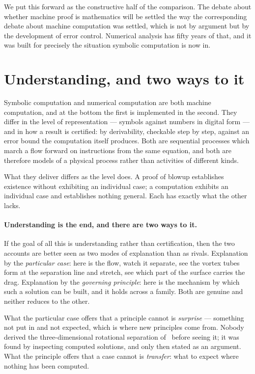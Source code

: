 \documentclass[11pt]{article}
\begin{document}
We put this forward as the constructive half of the comparison. The debate about whether machine
proof is mathematics will be settled the way the corresponding debate about machine computation was
settled, which is not by argument but by the development of error control. Numerical analysis has
fifty years of that, and it was built for precisely the situation symbolic computation is now in.

\section{Understanding, and two ways to it}\label{sec:summary}

Symbolic computation and numerical computation are both machine computation, and at the bottom the
first is implemented in the second. They differ in the level of representation --- symbols against
numbers in digital form --- and in how a result is certified: by derivability, checkable step by
step, against an error bound the computation itself produces. Both are sequential processes which
march a flow forward on instructions from the same equation, and both are therefore models of a
physical process rather than activities of different kinds.

What they deliver differs as the level does. A proof of blowup establishes existence without
exhibiting an individual case; a computation exhibits an individual case and establishes nothing
general. Each has exactly what the other lacks.

\paragraph{Understanding is the end, and there are two ways to it.} If the goal of all this is
understanding rather than certification, then the two accounts are better seen as two modes of
explanation than as rivals. Explanation by the \emph{particular case}: here is the flow, watch it
separate, see the vortex tubes form at the separation line and stretch, see which part of the surface
carries the drag. Explanation by the \emph{governing principle}: here is the mechanism by which such
a solution can be built, and it holds across a family. Both are genuine and neither reduces to the
other.

What the particular case offers that a principle cannot is \emph{surprise} --- something not put in
and not expected, which is where new principles come from. Nobody derived the three-dimensional
rotational separation of~\cite{dalembert} before seeing it; it was found by inspecting computed
solutions, and only then stated as an argument. What the principle offers that a case cannot is
\emph{transfer}: what to expect where nothing has been computed.
\end{document}
